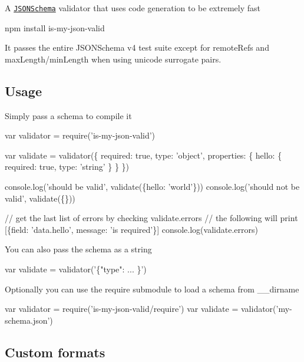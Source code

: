A \href{http://json-schema.org/}{\tt J\+S\+O\+N\+Schema} validator that uses code generation to be extremely fast


\begin{DoxyCode}
npm install is-my-json-valid
\end{DoxyCode}


It passes the entire J\+S\+O\+N\+Schema v4 test suite except for {\ttfamily remote\+Refs} and {\ttfamily max\+Length}/{\ttfamily min\+Length} when using unicode surrogate pairs.

\href{http://travis-ci.org/mafintosh/is-my-json-valid}{\tt }

\subsection*{Usage}

Simply pass a schema to compile it


\begin{DoxyCode}
var validator = require('is-my-json-valid')

var validate = validator(\{
  required: true,
  type: 'object',
  properties: \{
    hello: \{
      required: true,
      type: 'string'
    \}
  \}
\})

console.log('should be valid', validate(\{hello: 'world'\}))
console.log('should not be valid', validate(\{\}))

// get the last list of errors by checking validate.errors
// the following will print [\{field: 'data.hello', message: 'is required'\}]
console.log(validate.errors)
\end{DoxyCode}


You can also pass the schema as a string


\begin{DoxyCode}
var validate = validator('\{"type": ... \}')
\end{DoxyCode}


Optionally you can use the require submodule to load a schema from {\ttfamily \+\_\+\+\_\+dirname}


\begin{DoxyCode}
var validator = require('is-my-json-valid/require')
var validate = validator('my-schema.json')
\end{DoxyCode}


\subsection*{Custom formats}

